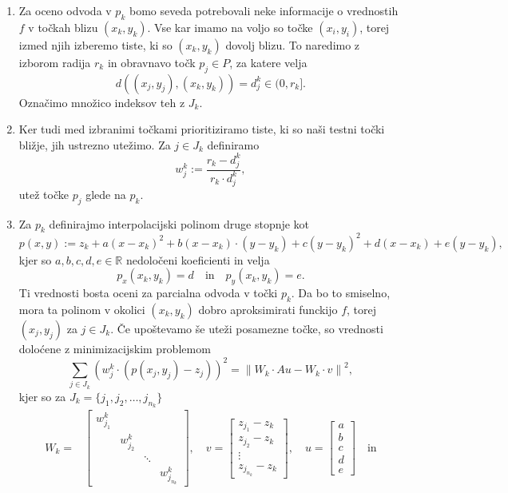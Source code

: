 \documentclass[ letterpaper, titlepage, fleqn]{article}
\newcommand{\R}{\mathbb R}
\newcommand{\norm}[1]{\left\lVert#1\right\rVert}
\begin{document}
{\begin{enumerate}
\item Za oceno odvoda v $p_k$  bomo seveda potrebovali neke informacije o vrednostih $f$ 
v točkah blizu $(x_k,y_k)$. Vse kar imamo na voljo so točke $(x_i,y_i)$, torej izmed njih
izberemo tiste, ki so $(x_k,y_k)$ dovolj blizu. To naredimo z izborom radija $r_k$ in obravnavo točk $p_j \in P$, 
za katere velja
$$d((x_j,y_j), (x_k,y_k)) = d^k_j \in (0, r_k].$$
Označimo množico indeksov teh z $J_k$.
\item Ker tudi med izbranimi točkami prioritiziramo tiste, ki so naši testni točki bližje,
jih ustrezno utežimo. Za $j \in J_k$ definiramo
$$w^k_j := \frac{r_k - d^k_j}{r_k \cdot d^k_j},$$
utež točke $p_j$ glede na $p_k$. 
\item Za $p_k$ definirajmo interpolacijski polinom druge stopnje kot
$$p(x,y) := z_k + a (x - x_k)^2 + b (x - x_k) \cdot (y - y_k) + c (y - y_k)^2 + d (x-x_k) + e(y-y_k),$$
kjer so $a,b,c,d,e \in \R$ nedoločeni koeficienti in velja 
$$p_x(x_k,y_k) = d \quad \text{in} \quad p_y(x_k,y_k) = e.$$
Ti vrednosti bosta oceni za parcialna odvoda v točki $p_k$.
Da bo to smiselno, mora ta polinom v okolici $(x_k,y_k)$ dobro aproksimirati funckijo $f$, torej $(x_j,y_j)$ za $j \in J_k$.
Če upoštevamo še uteži posamezne točke, so vrednosti doloćene z minimizacijskim problemom
$$\sum_{j\in J_k} (w^k_j \cdot (p(x_j,y_j) - z_j))^2 = \norm{W_k \cdot Au - W_k \cdot v}^2,$$
kjer so za $J_k = \{j_1, j_2, \dots, j_{n_k}\}$ \\
\begin{equation*}
\begin{aligned}
W_k = &
\begin{bmatrix}
w_{j_1}^k &  &  &  \\
& w_{j_2}^k &  &  \\
& & \ddots & \\
&  &  & w_{j_{n_k}}^k
\end{bmatrix},
\quad
v = 
\begin{bmatrix}
z_{j_1}- z_k \\
z_{j_2} - z_k \\
\vdots  \\
z_{j_{n_k}} - z_k
\end{bmatrix}, \quad
u =
\begin{bmatrix}
a \\
b \\
c \\
d \\
e
\end{bmatrix} \quad \text{in} \\[6pt]

\end{aligned}
\end{equation*}
\end{enumerate}}
\end{document}

